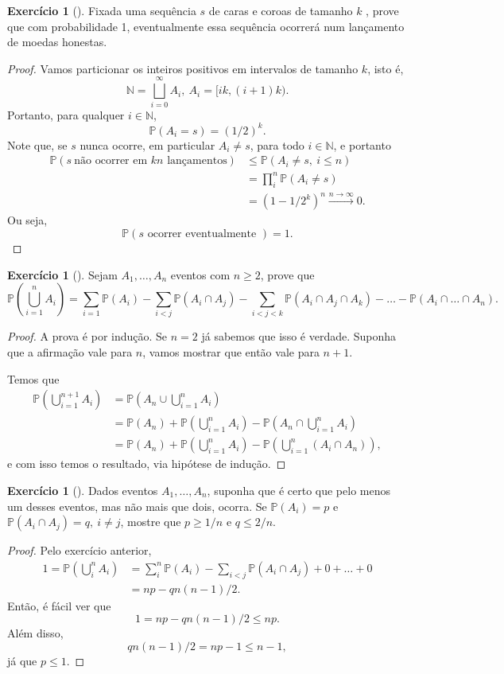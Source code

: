 \documentclass[12pt,a4paper,oneside]{book}
\theoremstyle{definition}
\newtheorem{xca}[theorem]{Exerc\'icio}
\theoremstyle{remark}
\numberwithin{equation}{section}
\newcommand{\N}{\mathbb{N}}
\newcommand{\pr}{\mathbb{P}}
\newcommand{\rarrowlimn}{\xrightarrow{n\rightarrow \infty}}
\begin{document}
\begin{xca}[\cite{grimmett2001one}]
Fixada uma sequência $s$ de caras e coroas de tamanho $k$ , prove que com probabilidade 1, eventualmente essa sequência ocorrerá num lançamento de moedas honestas.
\end{xca}
\begin{proof}
Vamos particionar os inteiros positivos em intervalos de tamanho $k$, isto é, 
$$\N = \bigsqcup_{i=0}^\infty A_i,\ A_i = [ik,(i+1)k). $$
Portanto, para qualquer $i\in \N$,
$$\pr(A_i = s) = (1/2)^k. $$
Note que, se $s$ nunca ocorre, em particular $A_i\neq s$, para todo $i\in \N$, e portanto
\begin{align*}
\pr(s\ \text{não ocorrer em $kn$ lançamentos}) &\leq \pr(A_i \neq s,\ i\leq n)\\
& = \prod_i^n \pr(A_i \neq s) \\
& = (1-1/2^k)^n \rarrowlimn 0 .
\end{align*}
Ou seja,
$$\pr(s \text{ ocorrer eventualmente }) = 1. $$
\end{proof}



\begin{xca}[\cite{grimmett2001one}]
Sejam $A_1,\dots,A_n$ eventos com $n\geq 2$, prove que
$$\pr\left( \bigcup^n_{i=1} A_i\right)  = \sum_{i=1}\pr(A_i) -\sum_{i<j}\pr(A_i\cap A_j)  -\sum_{i<j<k}\pr(A_i\cap A_j\cap A_k)-\dots- \pr(A_i\cap\dots\cap A_n). $$
\end{xca}

\begin{proof}
A prova é por indução. Se $n=2$ já sabemos que isso é verdade. Suponha que a afirmação vale para $n$,  vamos mostrar que então vale para $n+1$.

Temos que
\begin{align*}
\pr\left( \bigcup^{n+1}_{i=1} A_i\right) & = \pr\left(A_n \cup  \bigcup^{n}_{i=1} A_i \right)\\
&= \pr(A_n) + \pr(\bigcup^{n}_{i=1} A_i) - \pr(A_n\cap \bigcup^{n}_{i=1} A_i)\\
&= \pr(A_n) + \pr(\bigcup^{n}_{i=1} A_i) - \pr( \bigcup^{n}_{i=1} (A_i\cap A_n)),
\end{align*}
e com isso temos o resultado, via hipótese de indução.
\end{proof}

\begin{xca}[\cite{grimmett2001one}]
Dados eventos $A_1,\dots, A_n$, suponha que é certo que pelo menos um desses eventos, mas não mais que dois, ocorra. Se $\pr(A_i) = p$ e $\pr(A_i\cap A_j)=q,\ i\neq j$, mostre que $p\geq 1/n$ e $q\leq 2/n.$
\end{xca}
\begin{proof}
Pelo exercício anterior,
\begin{align*}
1 = \pr(\bigcup_i^n A_i) &= \sum_i^n\pr(A_i) - \sum_{i<j}\pr(A_i\cap A_j)+0+\dots+0\\
& = np - qn(n-1)/2.
\end{align*}
Então, é fácil ver que
$$1 = np-qn(n-1)/2 \leq np. $$
Além disso,
$$qn(n-1)/2 = np-1 \leq n-1,$$
já que $p\leq 1.$
\end{proof}
\end{document}

